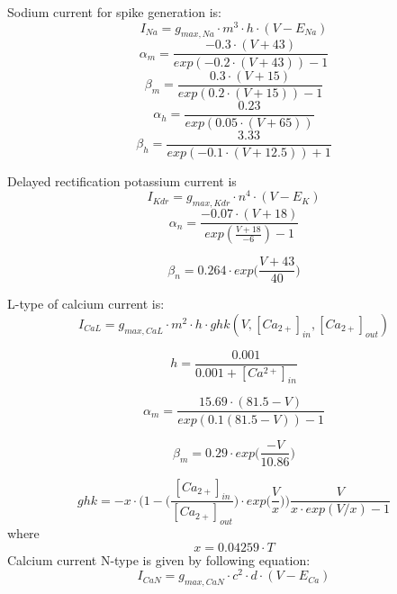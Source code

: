 \documentclass[a4paper,12pt]{article}
\begin{document}
Sodium current for spike generation is:
\begin{equation}
\label{eq:Nav}
I_{Na} = g_{max, Na} \cdot m^3 \cdot h \cdot (V - E_{Na})
\end{equation}
\begin{equation}
\alpha_m = \frac{-0.3 \cdot (V + 43)}{exp(-0.2\cdot(V+43)) - 1}
\end{equation}
\begin{equation}
\beta_m = \frac{0.3 \cdot (V + 15)}{exp(0.2\cdot(V+15)) - 1}
\end{equation}
\begin{equation}
\alpha_h = \frac{0.23}{exp(0.05\cdot(V+65))}
\end{equation}
\begin{equation}
\beta_h = \frac{3.33}{exp(-0.1\cdot(V+12.5)) + 1}
\end{equation}

Delayed rectification potassium current is
\begin{equation}
\label{eq:Kdrfast}
I_{Kdr} = g_{max, Kdr} \cdot n^4 \cdot (V - E_K)
\end{equation}
\begin{equation}
\alpha_n = \frac{-0.07 \cdot(V + 18)}{exp(\frac{V + 18}{-6}) - 1}
\end{equation}

\begin{equation}
\beta_n = 0.264 \cdot exp \Big( \frac{V + 43}{40} \Big)
\end{equation}

L-type of calcium current is: 
\begin{equation}
\label{eq:CavL}
I_{CaL} = g_{max, CaL} \cdot m^2 \cdot h \cdot ghk(V, [Ca_{2+}]_{in}, [Ca_{2+}]_{out} )
\end{equation}

\begin{equation}
h = \frac{0.001}{0.001 +[Ca^{2+}]_{in} }
\end{equation}

\begin{equation}
\alpha_{m} = \frac{15.69 \cdot (81.5-V)}{exp(0.1(81.5-V)) - 1}
\end{equation}

\begin{equation}
\beta_{m} = 0.29 \cdot exp \Big(\frac{-V}{10.86}\Big)
\end{equation}

\begin{equation}
ghk = -x \cdot \Big(1 - \Big(\frac{[Ca_{2+}]_{in}}{[Ca_{2+}]_{out}} \Big) \cdot exp \Big(\frac{V}{x}\Big) \Big) \frac{V}{x \cdot exp(V/x) -1 }
\end{equation}
where
\begin{equation}
x = 0.04259 \cdot T
\end{equation}
Calcium current N-type is given by following equation: 
\begin{equation}
\label{eq:CavN}
I_{CaN} = g_{max, CaN} \cdot c^2 \cdot d \cdot (V - E_{Ca})
\end{equation}
\end{document}
